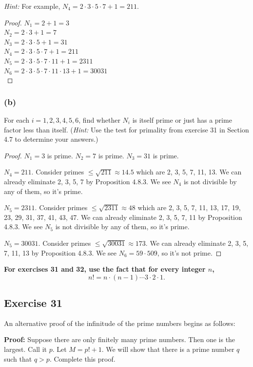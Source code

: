 \documentclass[14pt]{extarticle}
\newcommand{\cy}{\color{cyan}}
\begin{document}
{\it Hint:} For example, $N_4 = 2\cdot3\cdot5\cdot7 + 1 = 211$.

\begin{proof}
$N_1 = 2 + 1 = 3$\\
$N_2 = 2\cdot3 + 1 = 7$\\
$N_3 = 2\cdot3\cdot5 + 1 = 31$\\
$N_4 = 2\cdot3\cdot5\cdot7 + 1 = 211$\\
$N_5 = 2\cdot3\cdot5\cdot7\cdot11 + 1 = 2311$\\
$N_6 = 2\cdot3\cdot5\cdot7\cdot11\cdot13 + 1 = 30031$\\
\end{proof}

\subsubsection{(b)}
For each $i = 1, 2, 3, 4, 5, 6$, find whether $N_i$ is itself prime or just has a prime factor less than itself. ({\it Hint:} Use the test for primality from exercise 31 in Section 4.7 to determine your answers.)

\begin{proof}
$N_1 = 3$ is prime. $N_2 = 7$ is prime. $N_3 = 31$ is prime.

$N_4 = 211$. Consider primes $\leq \sqrt{211} \approx 14.5$ which are 2, 3, 5, 7, 11, 13. We can already eliminate 2, 3, 5, 7 by Proposition 4.8.3. We see $N_4$ is not divisible by any of them, so it's prime.

$N_5 = 2311$. Consider primes $\leq \sqrt{2311} \approx 48$ which are 2, 3, 5, 7, 11, 13, 17, 19, 23, 29, 31, 37, 41, 43, 47. We can already eliminate 2, 3, 5, 7, 11 by Proposition 4.8.3. We see $N_5$ is not divisible by any of them, so it's prime.

$N_5 = 30031$. Consider primes $\leq \sqrt{30031} \approx 173$. We can already eliminate 2, 3, 5, 7, 11, 13 by Proposition 4.8.3. We see $N_6 = 59 \cdot 509$, so it's not prime.
\end{proof}

{\bf \cy For exercises 31 and 32, use the fact that for every integer $n$,
\[
n! = n \cdot (n-1) \cdots 3\cdot 2\cdot 1.
\]
}
\subsection{Exercise 31}
An alternative proof of the infinitude of the prime numbers begins as follows:

{\bf Proof:} Suppose there are only finitely many prime numbers. Then one is the largest. Call it $p$. Let $M = p! + 1$. We will show that there is a prime number $q$ such that $q > p$. Complete this proof.
\end{document}
